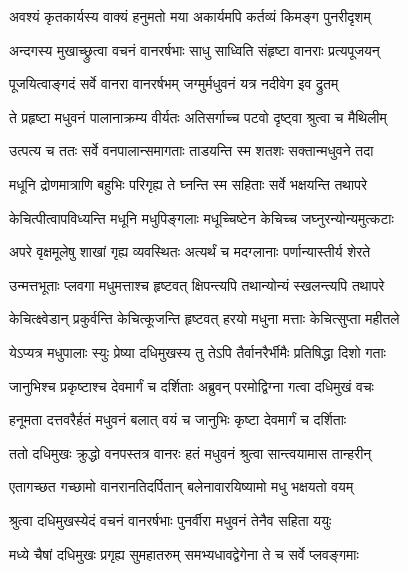 \twolineshloka
{अवश्यं कृतकार्यस्य वाक्यं हनुमतो मया}
{अकार्यमपि कर्तव्यं किमङ्ग पुनरीदृशम्} %

\twolineshloka
{अन्दगस्य मुखाच्छ्रुत्वा वचनं वानरर्षभाः}
{साधु साध्विति संहृष्टा वानराः प्रत्यपूजयन्} %

\twolineshloka
{पूजयित्वाङ्गदं सर्वे वानरा वानरर्षभम्}
{जग्मुर्मधुवनं यत्र नदीवेग इव द्रुतम्} %

\twolineshloka
{ते प्रहृष्टा मधुवनं पालानाक्रम्य वीर्यतः}
{अतिसर्गाच्च पटवो दृष्ट्वा श्रुत्वा च मैथिलीम्} %

\twolineshloka
{उत्पत्य च ततः सर्वे वनपालान्समागताः}
{ताडयन्ति स्म शतशः सक्तान्मधुवने तदा} %

\twolineshloka
{मधूनि द्रोणमात्राणि बहुभिः परिगृह्य ते}
{घ्नन्ति स्म सहिताः सर्वे भक्षयन्ति तथापरे} %

\twolineshloka
{केचित्पीत्वापविध्यन्ति मधूनि मधुपिङ्गलाः}
{मधूच्चिष्टेन केचिच्च जघ्नुरन्योन्यमुत्कटाः} %

\twolineshloka
{अपरे वृक्षमूलेषु शाखां गृह्य व्यवस्थितः}
{अत्यर्थं च मदग्लानाः पर्णान्यास्तीर्य शेरते} %

\twolineshloka
{उन्मत्तभूताः प्लवगा मधुमत्ताश्च हृष्टवत्}
{क्षिपन्त्यपि तथान्योन्यं स्खलन्त्यपि तथापरे} %

\twolineshloka
{केचित्क्ष्वेडान् प्रकुर्वन्ति केचित्कूजन्ति हृष्टवत्}
{हरयो मधुना मत्ताः केचित्सुप्ता महीतले} %

\twolineshloka
{येऽप्यत्र मधुपालाः स्युः प्रेष्या दधिमुखस्य तु}
{तेऽपि तैर्वानरैर्भीमैः प्रतिषिद्धा दिशो गताः} %

\twolineshloka
{जानुभिश्च प्रकृष्टाश्च देवमार्गं च दर्शिताः}
{अब्रुवन् परमोद्विग्ना गत्वा दधिमुखं वचः} %

\twolineshloka
{हनूमता दत्तवरैर्हतं मधुवनं बलात्}
{वयं च जानुभिः कृष्टा देवमार्गं च दर्शिताः} %

\twolineshloka
{ततो दधिमुखः क्रुद्धो वनपस्तत्र वानरः}
{हतं मधुवनं श्रुत्वा सान्त्वयामास तान्हरीन्} %

\twolineshloka
{एतागच्छत गच्छामो वानरानतिदर्पितान्}
{बलेनावारयिष्यामो मधु भक्षयतो वयम्} %

\twolineshloka
{श्रुत्वा दधिमुखस्येदं वचनं वानरर्षभाः}
{पुनर्वीरा मधुवनं तेनैव सहिता ययुः} %

\twolineshloka
{मध्ये चैषां दधिमुखः प्रगृह्य सुमहातरुम्}
{समभ्यधावद्वेगेना ते च सर्वे प्लवङ्गमाः} %

